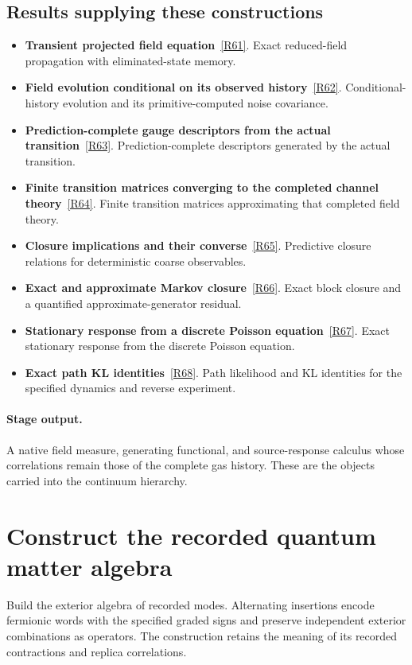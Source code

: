 \documentclass[11pt,a4paper]{article}
\begin{document}
\subsection*{Results supplying these constructions}
\begin{itemize}
\item \textbf{Transient projected field equation}~\hyperref[src:thm-algorithmic-transient-field-memory]{[R61]}. Exact reduced-field propagation with eliminated-state memory.
\item \textbf{Field evolution conditional on its observed history}~\hyperref[src:thm-algorithmic-field-filter]{[R62]}. Conditional-history evolution and its primitive-computed noise covariance.
\item \textbf{Prediction-complete gauge descriptors from the actual transition}~\hyperref[src:thm-sm-prediction-complete-descriptors]{[R63]}. Prediction-complete descriptors generated by the actual transition.
\item \textbf{Finite transition matrices converging to the completed channel theory}~\hyperref[src:thm-sm-predictive-partition-convergence]{[R64]}. Finite transition matrices approximating that completed field theory.
\item \textbf{Closure implications and their converse}~\hyperref[src:thm-closure-equivalence-cosmo]{[R65]}. Predictive closure relations for deterministic coarse observables.
\item \textbf{Exact and approximate Markov closure}~\hyperref[src:prop-cosmo-generator-closure]{[R66]}. Exact block closure and a quantified approximate-generator residual.
\item \textbf{Stationary response from a discrete Poisson equation}~\hyperref[src:thm-algorithmic-stationary-response]{[R67]}. Exact stationary response from the discrete Poisson equation.
\item \textbf{Exact path KL identities}~\hyperref[src:prop-algorithmic-path-kl-identities]{[R68]}. Path likelihood and KL identities for the specified dynamics and reverse experiment.
\end{itemize}
\paragraph{Stage output.} A native field measure, generating functional, and source-response calculus whose correlations remain those of the complete gas history. These are the objects carried into the continuum hierarchy.

\section{Construct the recorded quantum matter algebra}
\label{stage:13}
Build the exterior algebra of recorded modes. Alternating insertions encode fermionic words with the specified graded signs and preserve independent exterior combinations as operators. The construction retains the meaning of its recorded contractions and replica correlations.
\end{document}
